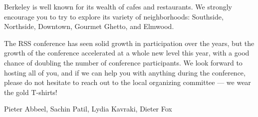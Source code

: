 Berkeley is well known for its wealth of cafes and restaurants. We strongly encourage you to try to explore its variety of neighborhoods: Southside, Northside, Downtown, Gourmet Ghetto, and Elmwood.

The RSS conference has seen solid growth in participation over the years, but the growth of the conference accelerated at a whole new level this year, with a good chance of doubling the number of conference participants. We look forward to hosting all of you, and if we can help you with anything during the conference, please do not hesitate to reach out to the local organizing committee --- we wear the gold T-shirts! 

\vspace{1cm}

Pieter Abbeel, Sachin Patil, Lydia Kavraki, Dieter Fox
%
\endgroup{}
\normalsize

